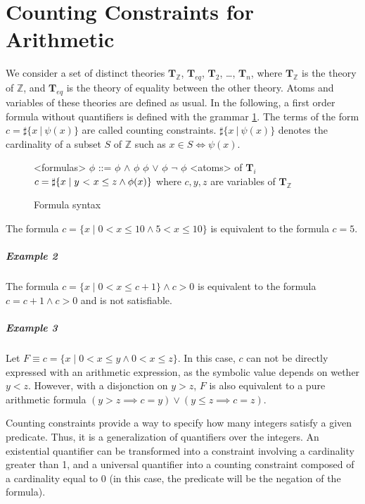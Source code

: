 \documentclass[]{article}
\begin{document}
\section{Counting Constraints for Arithmetic}

We consider a set of distinct theories $\mathbf{T}_\mathbb{Z}$,
$\mathbf{T}_{eq}$, $\mathbf{T}_2$, \ldots{}, $\mathbf{T}_n$, where
$\mathbf{T}_\mathbb{Z}$ is the theory of $\mathbb{Z}$, and
$\mathbf{T}_{eq}$ is the theory of equality between the other theory.
Atoms and variables of these theories are defined as usual. In the
following, a first order formula without quantifiers is defined with the
grammar \ref{formula}. The terms of the form
$c = \sharp\{ x\ |\ \psi(x) \}$ are called counting constraints. 
$\sharp\{ x\ |\ \psi(x)\}$ denotes the cardinality of a subset $S$
of $\mathbb{Z}$ such as $x \in S \iff \psi(x)$.

\begin{figure}[h]
\begin{grammar}
    
<formulas> $\phi$ ::= $\phi$ $\land$ $\phi$
\alt $\phi$ $\lor$ $\phi$
\alt $\lnot$ $\phi$
\alt <atoms> of $\mathbf{T}_i$
\alt $c = \sharp\{ x \mid y\ \text{\textless}\ x \le z \land \phi(x) \}$ where $c, y, z$ are variables of $\mathbf{T}_\mathbb{Z}$

\end{grammar}

\caption{Formula syntax}
\label{formula}
\end{figure}

\begin{example}
The formula $c = \{x \mid 0 < x \le 10 \land 5 < x \le 10\}$ is equivalent to the formula $c = 5$.
\end{example}

\subparagraph{Example 2} The formula $c = \{x \mid 0 < x \le c + 1\} \land c > 0$ is equivalent to the formula $c = c+1 \land c >0$ and is not satisfiable.

\subparagraph{Example 3} Let  $F \equiv c = \{x \mid 0 < x \le y \land 0 < x \le z\}$. In this case, $c$ can not be directly expressed with an arithmetic expression, as the symbolic value depends on wether $y < z$. However, with a disjonction on $y >z$, $F$ is also equivalent to a pure arithmetic formula $(y > z \implies c = y) \lor (y \le z \implies c = z)$.

Counting constraints provide a way to specify how many integers satisfy
a given predicate. Thus, it is a generalization of quantifiers over the
integers. An existential
quantifier can be transformed into a constraint involving a cardinality
greater than 1, and a universal quantifier into a counting constraint
composed of a cardinality equal to 0 (in this case, the predicate will
be the negation of the formula).
\end{document}
